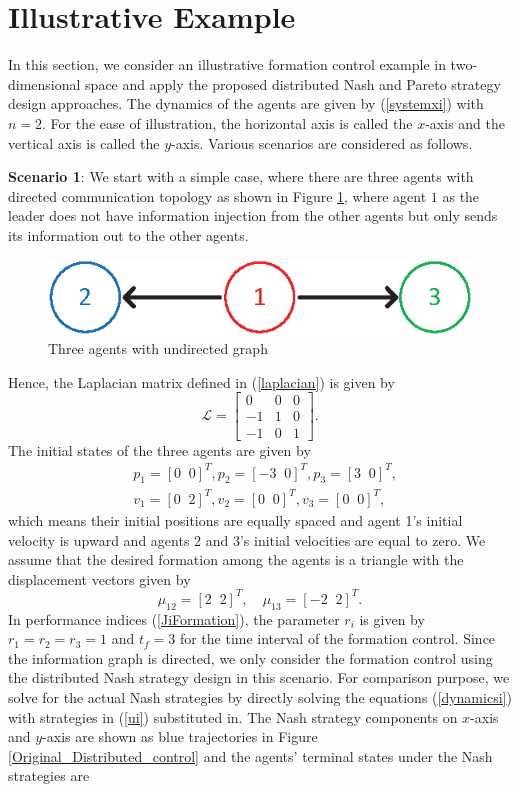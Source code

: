 \documentclass[letterpaper, 10 pt, conference,onecolumn]{ieeeconf}  %
\begin{document}
\section{Illustrative Example}\label{simulation}
In this section, we consider an illustrative formation control example in two-dimensional space and apply the proposed distributed Nash and Pareto strategy design approaches. The dynamics of the agents are given by (\ref{systemxi}) with $n=2$. For the ease of illustration, the horizontal axis is called the $x$-axis and the vertical axis is called the $y$-axis. Various scenarios are considered as follows.

\textbf{Scenario 1}: We start with a simple case, where there are three agents with directed communication topology as shown in Figure \ref{Formation3directed}, where agent $1$ as the leader does not have information injection from the other agents but only sends its information out to the other agents.
\begin{figure}[h!]
      \centering
      \includegraphics[scale=0.9]{Formation3directed.eps}
      \caption{Three agents with undirected graph}\label{Formation3directed}
\end{figure}
Hence, the Laplacian matrix defined in (\ref{laplacian}) is given by
\[\mathcal{L}=\begin{bmatrix}
0&0&0\\
-1&1&0\\
-1&0&1
\end{bmatrix}.\]
The initial states of the three agents are given by
{\begin{align*}
&p_1=[0\;\;0]^T, p_2=[-3\;\;0]^T,p_3=[3\;\;0]^T,\\
&v_1=[0\;\;2]^T,v_2=[0\;\;0]^T,v_3=[0\;\;0]^T,
\end{align*}}
which means their initial positions are equally spaced and agent 1's initial velocity is upward and agents 2 and 3's initial velocities are equal to zero. We assume that the desired formation among the agents is a triangle with the displacement vectors given by
\[\mu_{12}=[2\;\; 2]^T,\quad \mu_{13}=[-2\;\; 2]^T.\]
In performance indices (\ref{JiFormation}), the parameter $r_i$ is given by $r_1=r_2=r_3=1$ and $t_f=3$ for the time interval of the formation control. Since the information graph is directed, we only consider the formation control using the distributed Nash strategy design in this scenario. For comparison purpose, we solve for the actual Nash strategies by directly solving the equations (\ref{dynamicsi}) with strategies in (\ref{ui}) substituted in. The Nash strategy components on $x$-axis and $y$-axis are shown as blue trajectories in Figure \ref{Original_Distributed_control} and the agents' terminal states under the Nash strategies are
\end{document}
